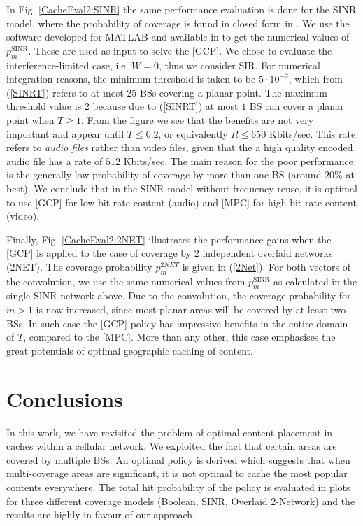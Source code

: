\documentclass[conference,twocolum,final]{IEEEtran}
\begin{document}
In Fig. \ref{CacheEval2:SINR} the same performance evaluation is done for the $\mathrm{SINR}$ model, where the probability of coverage is found in closed form in \cite{KeelerBartek13}. We use the software developed for MATLAB and available in \cite{KeelerMATLABk} to get the numerical values of $p_m^{\mathrm{SINR}}$. These are used as input to solve the [GCP]. We chose to evaluate the interference-limited case, i.e. $W=0$, thus we consider $\mathrm{SIR}$. For numerical integration reasons, the minimum threshold is taken to be $5\cdot 10^{-2}$, which from (\ref{SINRT}) refers to at most $25$ BSs covering a planar point. The maximum threshold value is $2$ because due to (\ref{SINRT}) at most $1$ BS can cover a planar point when $T\geq 1$. From the figure we see that the benefits are not very important and appear until $T\leq 0.2$, or equivalently $R\leq 650$ Kbits/sec. This rate refers to \textit{audio files} rather than video files, given that the a high quality encoded audio file has a rate of $512$ Kbits/sec. The main reason for the poor performance is the generally low probability of coverage by more than one BS (around $20\%$ at best). We conclude that in the $\mathrm{SINR}$ model without frequency reuse, it is optimal to use [GCP] for low bit rate content (audio) and [MPC] for high bit rate content (video).

Finally, Fig. \ref{CacheEval2:2NET} illustrates the performance gains when the [GCP] is applied to the case of coverage by 2 independent overlaid networks (2NET). The coverage probability $p_m^{2NET}$ is given in (\ref{2Net}). 
For both vectors of the convolution, we use the same numerical values from $p_m^{\mathrm{SINR}}$ as calculated in the single $\mathrm{SINR}$ network above. Due to the convolution, the coverage probability for $m>1$ is now increased, since most planar areas will be covered by at least two BSs. In such case the [GCP] policy has impressive benefits in the entire domain of $T$, compared to the [MPC]. More than any other, this case emphasises the great potentials of optimal geographic caching of content.



\section{Conclusions}
In this work, we have revisited the problem of optimal content placement in caches within a cellular network. We exploited the fact that certain areas are covered by multiple BSs. An optimal policy is derived which suggests that when multi-coverage areas are significant, it is not optimal to cache the most popular contents everywhere. The total hit probability of the policy is evaluated in plots for three different coverage models (Boolean, $\mathrm{SINR}$, Overlaid 2-Network) and the results are highly in favour of our approach.


\label{secVI}



\footnotesize

\end{document}
